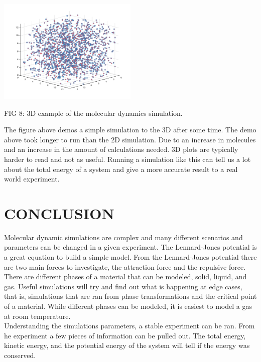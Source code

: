 \documentclass[reprint,amsmath,amssymb, aps, 10pt, a4paper, english, reqno]{revtex4-1}
\begin{document}
\begin{multicols}{2}
\begin{center}
    \includegraphics[width=0.50\textwidth]{3d.png}
    \caption{\small FIG 8: 3D example of the molecular dynamics simulation.}
\end{center}

The figure above demos a simple simulation to the 3D after some time. The demo above took longer to run than the 2D simulation. Due to an increase in molecules and an increase in the amount of calculations needed. 3D plots are typically harder to read and not as useful. Running a simulation like this can tell us a lot about the total energy of a system and give a more accurate result to a real world experiment. 

\section{\label{sec:level4} CONCLUSION} 

Molecular dynamic simulations are complex and many different scenarios and parameters can be changed in a given experiment. The Lennard-Jones potential is a great equation to build a simple model. From the Lennard-Jones potential there are two main forces to investigate, the attraction force and the repulsive force. \\

There are different phases of a material that can be modeled, solid, liquid, and gas. Useful simulations will try and find out what is happening at edge cases, that is, simulations that are ran from phase transformations and the critical point of a material. While different phases can be modeled, it is easiest to model a gas at room temperature. \\

Understanding the simulations parameters, a stable experiment can be ran. From he experiment a few pieces of information can be pulled out. The total energy, kinetic energy, and the potential energy of the system will tell if the energy was conserved. 



\end{multicols}
\end{document}

